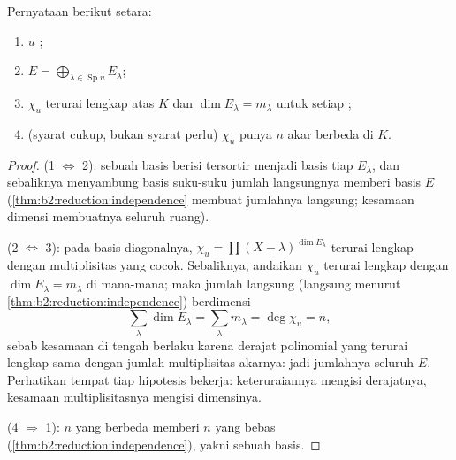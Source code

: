 \begin{theorem}\label{thm:b2:reduction:diagcrit}
Pernyataan berikut setara:
\begin{enumerate}
  \item $u$ ;
  \item $E = \bigoplus_{\lambda \in \operatorname{Sp} u} E_\lambda$;
  \item $\chi_u$ terurai lengkap atas $K$ dan $\dim E_\lambda = m_\lambda$
        untuk setiap ;
  \item (syarat cukup, bukan syarat perlu) $\chi_u$ punya $n$ akar
        berbeda di $K$.
\end{enumerate}
\end{theorem}

\begin{proof}
(1 $\iff$ 2): sebuah basis berisi  tersortir menjadi basis
tiap $E_\lambda$, dan sebaliknya menyambung basis suku-suku jumlah
langsungnya memberi basis $E$
(\cref{thm:b2:reduction:independence} membuat jumlahnya langsung;
kesamaan dimensi membuatnya seluruh ruang).

(2 $\iff$ 3): pada basis diagonalnya, $\chi_u = \prod (X -
\lambda)^{\dim E_\lambda}$ terurai lengkap dengan multiplisitas yang
cocok. Sebaliknya, andaikan $\chi_u$ terurai lengkap dengan $\dim
E_\lambda = m_\lambda$ di mana-mana; maka jumlah langsung 
(langsung menurut \cref{thm:b2:reduction:independence}) berdimensi
\[
\sum_{\lambda}\dim E_\lambda = \sum_{\lambda} m_\lambda =
\deg\chi_u = n ,
\]
sebab kesamaan di tengah berlaku karena derajat polinomial yang terurai
lengkap sama dengan jumlah multiplisitas akarnya: jadi jumlahnya seluruh
$E$. Perhatikan tempat tiap hipotesis bekerja: keteruraiannya mengisi
derajatnya, kesamaan multiplisitasnya mengisi dimensinya.

(4 $\Rightarrow$ 1): $n$  yang berbeda memberi $n$  yang bebas (\cref{thm:b2:reduction:independence}), yakni sebuah basis.
\end{proof}

